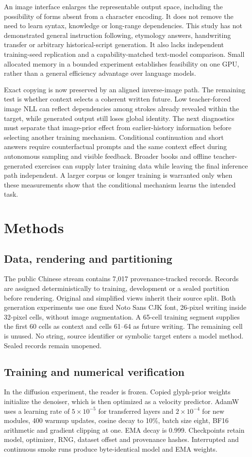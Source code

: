 An image interface enlarges the representable output space, including the
possibility of forms absent from a character encoding. It does not remove the
need to learn syntax, knowledge or long-range dependencies. This study has not
demonstrated general instruction following, etymology answers, handwriting
transfer or arbitrary historical-script generation. It also lacks independent
training-seed replication and a capability-matched text-model comparison.
Small allocated memory in a bounded experiment establishes feasibility on one
GPU, rather than a general efficiency advantage over language models.

Exact copying is now preserved by an aligned inverse-image path. The remaining
test is whether context selects a coherent written future. Low teacher-forced
image NLL can reflect dependencies among strokes already revealed within the
target, while generated output still loses global identity. The next
diagnostics must separate that image-prior effect from earlier-history
information before selecting another training mechanism. Conditional
continuation and short answers require counterfactual prompts and the same
context effect during autonomous sampling and visible feedback.
Broader books and offline teacher-generated exercises can supply later
training data while leaving the final inference path independent. A larger
corpus or longer training is warranted only when these measurements show
that the conditional mechanism learns the intended task.

\section*{Methods}
\subsection*{Data, rendering and partitioning}
The public Chinese stream contains 7,017 provenance-tracked records. Records
are assigned deterministically to training, development or a sealed partition
before rendering. Original and simplified views inherit their source split.
Both generation experiments use one fixed Noto Sans CJK font, 26-pixel writing
inside 32-pixel cells, without image augmentation. A 65-cell training segment
supplies the first 60 cells as context and cells 61--64 as future writing.
The remaining cell is unused. No string, source identifier or symbolic target
enters a model method. Sealed records remain unopened.

\subsection*{Training and numerical verification}
In the diffusion experiment, the reader is frozen. Copied glyph-prior weights initialize the denoiser,
which is then optimized as a velocity predictor. AdamW uses a learning rate of
$5\times10^{-5}$ for transferred layers and $2\times10^{-4}$ for new modules,
400 warmup updates, cosine decay to 10\%, batch size eight, BF16 arithmetic and
gradient clipping at one. EMA decay is 0.999. Checkpoints retain model,
optimizer, RNG, dataset offset and provenance hashes. Interrupted and
continuous smoke runs produce byte-identical model and EMA weights.

